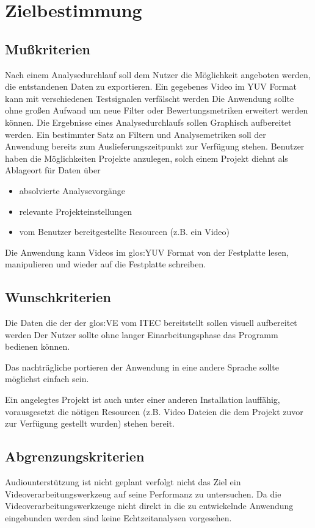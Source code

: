\chapter{Zielbestimmung}

\section{Mußkriterien}
\setcounter{enumi}{0}
 Nach einem Analysedurchlauf soll dem Nutzer die Möglichkeit angeboten werden, die entstandenen Daten zu exportieren. %
 Ein gegebenes Video im YUV Format kann mit verschiedenen Testsignalen verfälscht werden %
 Die Anwendung sollte ohne großen Aufwand um neue Filter oder Bewertungsmetriken erweitert werden können. %
 Die Ergebnisse eines Analysedurchlaufs sollen Graphisch aufbereitet werden. %
 Ein bestimmter Satz an Filtern und Analysemetriken soll der Anwendung bereits zum Auslieferungszeitpunkt zur Verfügung stehen.
 Benutzer haben die Möglichkeiten Projekte anzulegen, solch einem Projekt diehnt als Ablageort für Daten über 
\begin{itemize}
\item absolvierte Analysevorgänge
\item relevante Projekteinstellungen
\item vom Benutzer bereitgestellte Resourcen (z.B. ein Video)
\end{itemize}
 Die Anwendung kann Videos im \gls{glos:YUV} Format von der Festplatte lesen, manipulieren und wieder auf die Festplatte schreiben.

\section{Wunschkriterien}
\setcounter{enumi}{0}
 Die Daten die der der \gls{glos:VE} vom \gls{ITEC}  bereitstellt sollen visuell aufbereitet werden
 Der Nutzer sollte ohne langer Einarbeitungsphase das Programm bedienen können.

 Das nachträgliche portieren der Anwendung in eine andere Sprache sollte möglichst einfach sein.

 Ein angelegtes Projekt ist auch unter einer anderen \projektTitel Installation lauffähig, vorausgesetzt die nötigen Resourcen (z.B. Video Dateien die dem Projekt zuvor zur Verfügung gestellt wurden) stehen bereit.

\section{Abgrenzungskriterien}
\setcounter{enumi}{0}
 Audiounterstützung ist nicht geplant
 \projektTitel verfolgt nicht das Ziel ein Videoverarbeitungswerkzeug auf seine Performanz zu untersuchen.
 Da die Videoverarbeitungswerkzeuge nicht direkt in die zu entwickelnde Anwendung eingebunden werden sind keine Echtzeitanalysen vorgesehen.

